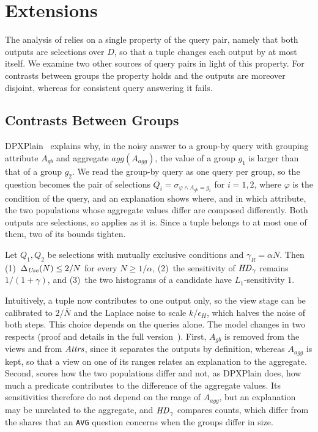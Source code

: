 
\section{Extensions}
\label{sec:extension}

The analysis of \sys{} relies on a single property of the query pair, namely that both outputs are selections over $D$, so that a tuple changes each output by at most itself.
We examine two other sources of query pairs in light of this property.
For contrasts between groups the property holds and the outputs are moreover disjoint, whereas for consistent query answering it fails.

\subsection{Contrasts Between Groups}
\label{subsec:ext-contrast}

DPXPlain~\cite{TaoGMR22} explains why, in the noisy answer to a group-by query with grouping attribute $A_{gb}$ and aggregate $agg(A_{agg})$, the value of a group $g_1$ is larger than that of a group $g_2$.
We read the group-by query as one query per group, so the question becomes the pair of selections $Q_i=\sigma_{\varphi\wedge A_{gb}=g_i}$ for $i=1,2$, where $\varphi$ is the condition of the query, and an explanation shows where, and in which attribute, the two populations whose aggregate values differ are composed differently.
Both outputs are selections, so \sys{} applies as it is.
Since a tuple belongs to at most one of them, two of its bounds tighten.

\begin{proposition}
\label{prop:contrast-sensitivity}
Let $Q_1,Q_2$ be selections with mutually exclusive conditions and $\gamma_R=\alpha N$.
Then (1)~$\Delta_{\mathit{Use}}(N)\le 2/N$ for every $N\ge1/\alpha$, (2)~the sensitivity of $\mathit{HD}_\gamma$ remains $1/(1+\gamma)$, and (3)~the two histograms of a candidate 
have $L_1$-sensitivity $1$.
\end{proposition}

Intuitively, a tuple now contributes to one output only, so the view stage can be calibrated to $2/\bar N$ and the Laplace noise to scale $k/\epsilon_H$, which halves the noise of both steps.
This choice depends on the queries alone.
The model changes in two respects (proof and details in \ifpaper the full version~\cite{fullversion}\else {}\fi).
First, $A_{gb}$ is removed from the views and from $\mathit{Attrs}$, since it separates the outputs by definition, whereas $A_{agg}$ is kept, so that a view on one of its ranges relates an explanation to the aggregate.
Second, \sys{} scores how the two populations differ and not, as DPXPlain does, how much a predicate contributes to the difference of the aggregate values.
Its sensitivities therefore do not depend on the range of $A_{agg}$, but an explanation may be unrelated to the aggregate, and $\mathit{HD}_\gamma$ compares counts, which differ from the shares that an \texttt{AVG} question concerns when the groups differ in size.

